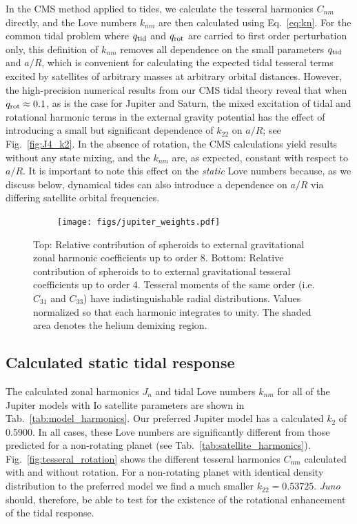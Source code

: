 In the CMS method applied to tides, we calculate the tesseral harmonics $C_{nm}$
directly, and the Love numbers $k_{nm}$ are then calculated using Eq.~\ref{eq:kn}.
For the common tidal problem where $q_{\rm tid}$ and $q_{\rm rot}$ are carried to
first order perturbation only, this definition of $k_{nm}$ removes all dependence on
the small parameters $q_{\rm tid}$ and $a/R$, which is convenient for calculating the
expected tidal tesseral terms excited by satellites of arbitrary masses at arbitrary
orbital distances.  However, the high-precision numerical results from our CMS tidal
theory reveal that when $q_{\rm rot} \approx 0.1$, as is the case for Jupiter and
Saturn, the mixed excitation of tidal and rotational harmonic terms in the external
gravity potential has the effect of introducing a small but significant dependence of
$k_{22}$ on $a/R$; see Fig.~\ref{fig:J4_k2}. In the absence of rotation, the CMS
calculations yield results without any state mixing, and the $k_{nm}$ are, as
expected, constant with respect to $a/R$.  It is important to note this effect on the
{\it static} Love numbers because, as we discuss below, dynamical tides can also
introduce a dependence on $a/R$ via differing satellite orbital frequencies.

\begin{figure}[h!]  
  \centering
    \texttt{[image: figs/jupiter\_weights.pdf]}
\caption{Top: Relative contribution of spheroids to external gravitational zonal
    harmonic coefficients up to order 8. Bottom: Relative contribution of spheroids
    to to external gravitational tesseral coefficients up to order 4. Tesseral
    moments of the same order (i.e. $C_{31}$ and $C_{33}$) have indistinguishable
radial distributions. Values normalized so that each harmonic integrates to unity.
The shaded area denotes the helium demixing region.  }
\label{fig:jupiter_weights}
\end{figure}

\subsection{Calculated static tidal response}

The calculated zonal harmonics $J_n$ and tidal Love numbers $k_{nm}$ for all of the
Jupiter models with Io satellite parameters are shown in
Tab.~\ref{tab:model_harmonics}. Our preferred Jupiter model has a calculated $k_{2}$
of 0.5900. In all cases, these Love numbers are significantly different from those
predicted for a non-rotating planet (see Tab.~\ref{tab:satellite_harmonics}).
Fig.~\ref{fig:tesseral_rotation} shows the different tesseral harmonics $C_{nm}$
calculated with and without rotation. For a non-rotating planet with identical
density distribution to the preferred model we find a much smaller $k_{22}=0.53725$.
\textit{Juno} should, therefore, be able to test for the existence of the rotational
enhancement of the tidal response.


